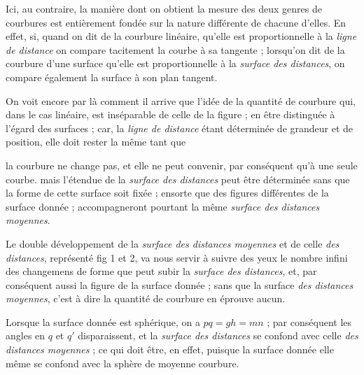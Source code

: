 \documentclass[11pt,a4paper]{article}
\begin{document}

Ici, au contraire, la manière dont on obtient la mesure des deux genres de
courbures est entièrement fondée sur la nature différente de chacune d'elles.
En effet, si, quand on dit de la courbure linéaire, qu'elle est
proportionnelle à la \emph{ligne de distance} on compare tacitement la
courbe à sa tangente ; lorsqu'on dit de la courbure d'une surface qu'elle
est proportionnelle à la \emph{surface des distances}, on compare également
la surface à son plan tangent.

On voit encore par là comment il arrive que l'idée de la quantité de
courbure qui, dans le cas linéaire, est inséparable de celle de la figure ;
 en être distinguée à l'égard des surfaces ; car, la
\emph{ligne de distance} étant déterminée de grandeur et de position, elle
doit rester la même tant que


la courbure ne change pas, et elle ne peut convenir, par conséquent qu'à une
seule courbe. mais l'étendue de la \emph{surface des distances} peut être
déterminée sans que la forme de cette surface soit fixée ; ensorte que des
figures différentes de la surface donnée ; accompagneront pourtant la même
\emph{surface des distances moyennes}.


Le double développement de la \emph{surface des distances moyennes} et de
celle \emph{des distances}, représenté fig 1 et 2, va nous servir à suivre
des yeux le nombre infini des changemens de forme que peut subir la
\emph{surface des distances}, et, par conséquent aussi la figure de la
surface donnée ; sans que la surface \emph{des distances moyennes}, c'est à
dire la quantité de courbure en éprouve aucun.

Lorsque la surface donnée est sphérique, on a $pq = gh = mn$ ; par
conséquent les angles en $q$ et $q'$ disparaissent, et la \emph{surface des
distances} se confond avec celle \emph{des distances moyennes} ; ce qui doit
être, en effet, puisque la surface donnée elle même se confond avec la
sphère de moyenne courbure.
\end{document}
